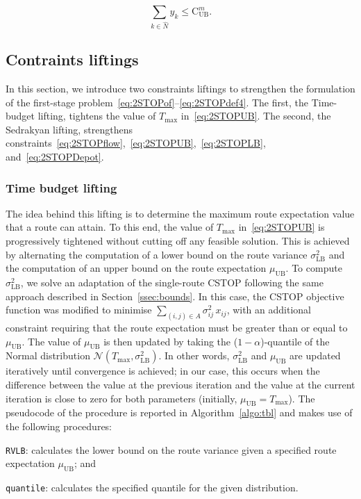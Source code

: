 \documentclass[11pt]{article}
\theoremstyle{definition}
\begin{document}
\[\sum_{k \in \hat{N}} y_{k} \leq \text{C}^m_{\text{UB}}.\]



\subsection{Contraints liftings}
\label{ssec:cl}

In this section, we introduce two constraints liftings to strengthen the formulation of the first-stage problem~\eqref{eq:2STOPof}--\eqref{eq:2STOPdef4}. The first, the Time-budget lifting, tightens the value of $T_{\max}$ in~\eqref{eq:2STOPUB}. The second, the Sedrakyan lifting, strengthens constraints~\eqref{eq:2STOPflow},~\eqref{eq:2STOPUB},~\eqref{eq:2STOPLB}, and~\eqref{eq:2STOPDepot}.

\subsubsection{Time budget lifting}
The idea behind this lifting is to determine the maximum route expectation value that a route can attain.
To this end, the value of $T_{\max}$ in~\eqref{eq:2STOPUB} is progressively tightened without cutting off any feasible solution. This is achieved by alternating the computation of a lower bound on the route variance $\sigma^2_{\text{LB}}$ and the computation of an upper bound on the route expectation $\mu_{\text{UB}}$.
To compute $\sigma^2_{\text{LB}}$, we solve an adaptation of the single-route CSTOP following the same approach described in Section~\ref{ssec:bounds}. In this case, the CSTOP objective function was modified to minimise $\sum_{(i,j) \in A} \sigma^2_{ij} \, x_{ij}$, with an additional constraint requiring that the route expectation must be greater than or equal to $\mu_{\text{UB}}$.
%
The value of $\mu_{\text{UB}}$ is then updated by taking the (${1-\alpha}$)-quantile of the Normal distribution $\mathcal{N}(T_{\max}, \sigma^2_{\text{LB}})$. In other words, $\sigma^2_{\text{LB}}$ and $\mu_{\text{UB}}$ are updated iteratively until convergence is achieved; in our case, this occurs when the difference between the value at the previous iteration and the value at the current iteration is close to zero for both parameters (initially, $\mu_{\text{UB}} = T_{\max}$).
%
The pseudocode of the procedure is reported in Algorithm~\ref{algo:tbl} and makes use of the following procedures:
%
\begin{inparaenum}[(i)]
	\item \texttt{RVLB}: calculates the lower bound on the route variance given a specified route expectation $\mu_{\text{UB}}$; and
	\item \texttt{quantile}: calculates the specified quantile for the given distribution.
\end{inparaenum}
\end{document}
